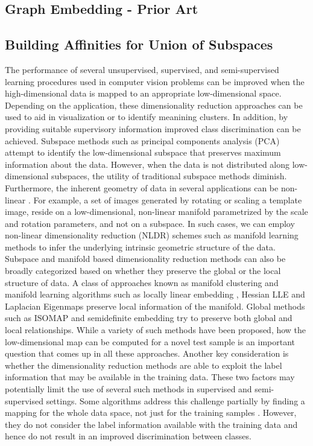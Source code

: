 \subsection{Graph Embedding - Prior Art}

\subsection{Building Affinities for Union of Subspaces}

The performance of several unsupervised, supervised, and semi-supervised learning procedures used in computer vision problems can be improved when the high-dimensional data is mapped to an appropriate low-dimensional space. Depending on the application, these dimensionality reduction approaches can be used to aid in visualization or to identify meanining clusters. In addition, by providing suitable supervisory information improved class discrimination can be achieved. Subspace methods such as principal components analysis (PCA) attempt to identify the low-dimensional subspace that preserves maximum information about the data. However, when the data is not distributed along low-dimensional subspaces, the utility of traditional subspace methods diminish. Furthermore, the inherent geometry of data in several applications can be non-linear \cite{chang2006manifold,seung2000manifold}. For example, a set of images generated by rotating or scaling a template image, reside on a low-dimensional, non-linear manifold parametrized by the scale and rotation parameters, and not on a subspace. In such cases, we can employ non-linear dimensionality reduction (NLDR) schemes such as manifold learning methods to infer the underlying intrinsic geometric structure of the data. Subspace and manifold based dimensionality reduction methods can also be broadly categorized based on whether they preserve the global or the local structure of data. A class of approaches known as manifold clustering and manifold learning algorithms such as locally linear embedding \cite{Saul00anintroduction}, Hessian LLE \cite{Donoho03hessianeigenmaps} and Laplacian Eigenmaps \cite{Belkin01laplacianeigenmaps} preserve local information of the manifold. Global methods such as ISOMAP \cite{isomaps} and semidefinite embedding \cite{Weinberger04} try to preserve both global and local relationships. While a variety of such methods have been proposed, how the low-dimensional map can be computed for a novel test sample is an important question that comes up in all these approaches. Another key consideration is whether the dimensionality reduction methods are able to exploit the label information that may be available in the training data. These two factors may  potentially limit the use of several such methods in supervised and semi-supervised settings. Some algorithms address this challenge partially by finding a mapping for the whole data space, not just for the training samples \cite{athitsos2004boostmap,he2003learning,roweis2002global,lowe1997neuroscale}. However, they do not consider the label information available with the training data and hence do not result in an improved discrimination between classes. 

